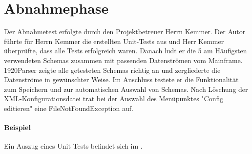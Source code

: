 \section{Abnahmephase} 
\label{sec:Abnahmephase}
Der Abnahmetest erfolgte durch den Projektbetreuer Herrn Kemmer. Der Autor führte für Herrn Kemmer die erstellten Unit-Tests aus und Herr Kemmer überprüfte, dass alle Tests erfolgreich waren. Danach ludt er die 5 am Häufigsten verwendeten Schemas zusammen mit passenden Datenströmen vom Mainframe. 1920Parser zeigte alle getesteten Schemas richtig an und zergliederte die Datenströme in gewünschter Weise. Im Anschluss testete er die Funktionalität zum Speichern und zur automatischen Auswahl von Schemas. Nach Löschung der XML-Konfigurationsdatei trat bei der Auswahl des Menüpunktes "Config editieren" eine FileNotFoundException auf.

\paragraph{Beispiel}
Ein Auszug eines Unit Tests befindet sich im .


